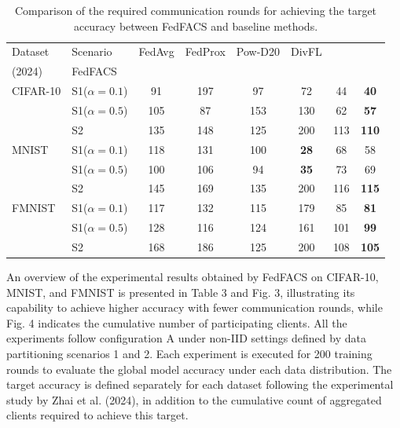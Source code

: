 \documentclass[pdflatex,sn-mathphys-num,oneside]{sn-jnl}%
\theoremstyle{thmstyleone}%
\theoremstyle{thmstyletwo}%
\theoremstyle{thmstylethree}%
\newlength{\journalfloatwidth}
\begin{document}
\FloatBarrier

\begin{table}[!htbp]
\centering
\footnotesize
\setlength{\tabcolsep}{4pt}
\renewcommand{\arraystretch}{1.15}
\setlength{\abovecaptionskip}{2pt}
\setlength{\belowcaptionskip}{4pt}

\caption{Comparison of the required communication rounds for achieving the target accuracy between FedFACS and baseline methods.}
\label{tab:round_cfgA}

\begin{tabular*}{\journalfloatwidth}{@{\extracolsep{\fill}}llcccccc@{}}
\toprule
Dataset & Scenario & FedAvg & FedProx & Pow-D20 & DivFL &
\begin{tabular}[c]{@{}c@{}}Zhai~et~al.\\(2024)\end{tabular} & FedFACS \\
\midrule
CIFAR-10 & S1($\alpha{=}0.1$) & 91 & 197 & 97 & 72 & 44 & \textbf{40} \\
         & S1($\alpha{=}0.5$) & 105 & 87 & 153 & 130 & 62 & \textbf{57} \\
         & S2                 & 135 & 148 & 125 & 200 & 113 & \textbf{110} \\

MNIST    & S1($\alpha{=}0.1$) & 118 & 131 & 100 & \textbf{28} & 68 & 58 \\
         & S1($\alpha{=}0.5$) & 100 & 106 & 94 & \textbf{35} & 73 & 69 \\
         & S2                 & 145 & 169 & 135 & 200 & 116 & \textbf{115} \\

FMNIST   & S1($\alpha{=}0.1$) & 117 & 132 & 115 & 179 & 85 & \textbf{81} \\
         & S1($\alpha{=}0.5$) & 128 & 116 & 124 & 161 & 101 & \textbf{99} \\
         & S2                 & 168 & 186 & 125 & 200 & 108 & \textbf{105} \\
\bottomrule
\end{tabular*}
\end{table}

\FloatBarrier


An overview of the experimental results obtained by FedFACS on CIFAR-10, MNIST, and FMNIST is presented in Table 3 and Fig. 3, illustrating its capability to achieve higher accuracy with fewer communication rounds, while Fig. 4 indicates the cumulative number of participating clients. All the experiments follow configuration A under non-IID settings defined by data partitioning 
scenarios 1 and 2. Each experiment is executed for 200 training rounds to evaluate the global model accuracy under each data distribution. The target accuracy is defined separately for each dataset following the experimental study by Zhai et al. (2024), in addition to the cumulative count of aggregated clients required to achieve this target.
\end{document}
